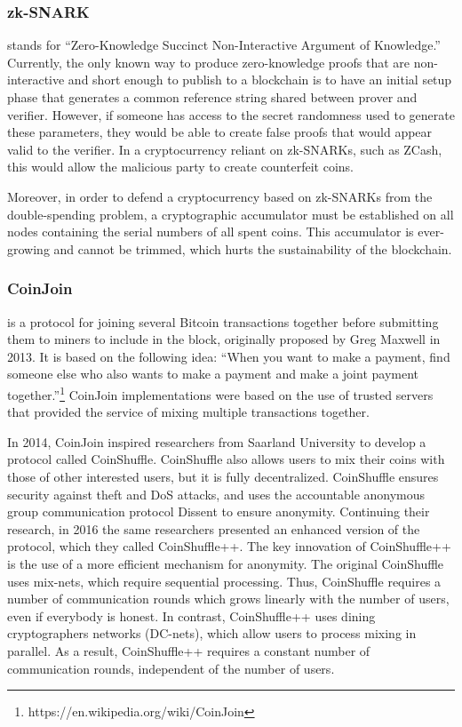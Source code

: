 \documentclass[a4paper, 10pt, conference]{ieeeconf}
\begin{document}
\subsubsection{zk-SNARK} stands for ``Zero-Knowledge Succinct Non-Interactive Argument of Knowledge.'' Currently, the only known way to produce zero-knowledge proofs that are non-interactive and short enough to publish to a blockchain is to have an initial setup phase that generates a common reference string shared between prover and verifier. However, if someone has access to the secret randomness used to generate these parameters, they would be able to create false proofs that would appear valid to the verifier. In a cryptocurrency reliant on zk-SNARKs, such as ZCash, this would allow the malicious party to create counterfeit coins. 

Moreover, in order to defend a cryptocurrency based on zk-SNARKs from the double-spending problem, a cryptographic accumulator must be established on all nodes containing the serial numbers of all spent coins. This accumulator is ever-growing and cannot be trimmed, which hurts the sustainability of the blockchain.

\subsubsection{CoinJoin} is a protocol for joining several Bitcoin transactions together before submitting them to miners to include in the block, originally proposed by Greg Maxwell in 2013. It is based on the following idea: ``When you want to make a payment, find someone else who also wants to make a payment and make a joint payment together.''\footnote{https://en.wikipedia.org/wiki/CoinJoin} CoinJoin implementations were based on the use of trusted servers that provided the service of mixing multiple transactions together.

In 2014, CoinJoin inspired researchers from Saarland University to develop a protocol called CoinShuffle\cite{c17}. CoinShuffle also allows users to mix their coins with those of other interested users, but it is fully decentralized. CoinShuffle ensures security against theft and DoS attacks, and uses the accountable anonymous group communication protocol Dissent to ensure anonymity. Continuing their research, in 2016 the same researchers presented an enhanced version of the protocol, which they called CoinShuffle++\cite{c18}. The key innovation of CoinShuffle++ is the use of a more efficient mechanism for anonymity. The original CoinShuffle uses mix-nets, which require sequential processing. Thus, CoinShuffle requires a number of communication rounds which grows linearly with the number of users, even if everybody is honest. In contrast, CoinShuffle++ uses dining cryptographers networks (DC-nets)\cite{c20}, which allow users to process mixing in parallel. As a result, CoinShuffle++ requires a constant number of communication rounds, independent of the number of users. 
\end{document}
